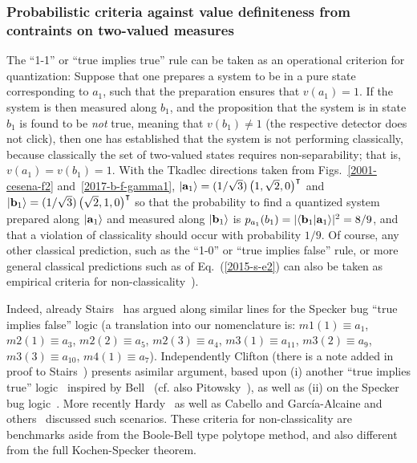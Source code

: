 \subsubsection*{Probabilistic criteria against value definiteness from contraints on two-valued measures}
\label{2017-b-ss-pc}

The ``1-1'' or  ``true implies true'' rule can be taken as an operational criterion for quantization:
Suppose that one prepares a system to be in a pure state
corresponding to $a_1$, such that the preparation ensures that $v(a_1)=1$.
If the system is then measured along $b_1$, and the proposition that
the system is in state $b_1$  is found  to be {\em not} true, meaning that $v(b_1)\neq 1$ (the respective detector does not click),
then  one has established that the system is not performing classically,
because classically the set of two-valued states requires non-separability; that is, $v(a_1)=v(b_1)=1$.
With the Tkadlec directions taken from Figs.~\ref{2001-cesena-f2} and~\ref{2017-b-f-gamma1},
$\vert {\bf a}_1\rangle = (1/\sqrt{3}) \left(    1,\sqrt{2},0     \right)^\intercal$ and
$\vert {\bf b}_1\rangle = (1/\sqrt{3})\left(     \sqrt{2},1,0      \right)^\intercal$
so that the probability to find a quantized system prepared along $\vert {\bf a}_1\rangle$
and measured along $\vert {\bf b}_1\rangle$ is
$p_{a_1}(b_1) = \vert \langle {\bf b}_1 \vert {\bf a}_1 \rangle \vert^2=  8/9  $,
and that a violation of classicality should occur with probability $1/9$.
Of course, any other classical prediction, such as the ``1-0'' or ``true implies false'' rule,
or more general  classical predictions such as of Eq.~(\ref{2015-s-e2})
can also be taken as empirical criteria for non-classicality~\cite[Sect.~11.3.2.]{svozil-2016-s}).

Indeed, already Stairs~\cite[p.~588-589]{stairs83} has argued along similar lines for the Specker bug
``true implies false'' logic (a translation into our nomenclature
is:
$m1(1) \equiv a_1$,
$m2(1) \equiv a_3$,
$m2(2) \equiv a_5$,
$m2(3) \equiv a_4$,
$m3(1) \equiv a_{11}$,
$m3(2) \equiv a_9$,
$m3(3) \equiv a_{10}$,
$m4(1) \equiv a_7$).
Independently Clifton (there is a note added in proof to Stairs~\cite[p.~588-589]{stairs83})
presents asimilar argument, based upon (i) another ``true implies true'' logic~\cite[Sects.~II,III, Fig.~1]{clifton-93,Johansen-1994,Vermaas-1994}
inspired by Bell~\cite[Fig.~C.l. p.~67]{Belinfante-73} (cf. also Pitowsky~\cite[p.~394]{Pitowsky-1982-subs}),
as well as (ii) on the Specker bug logic~\cite[Sects.~IV, Fig.~2]{clifton-93}.
More recently Hardy~\cite{Hardy-92,Hardy-93,hardy-97}
as well as Cabello and
Garc{\'{i}}a-Alcaine and
others~\cite{Cabello-1995-ppks,cabello-96,cabello-97-nhvp,Badziag-2011,Cabello-2013-HP,Cabello-2013-Hardylike} discussed such scenarios.
These criteria for non-classicality are benchmarks aside from the Boole-Bell type polytope method,
and also different from the full Kochen-Specker theorem.



